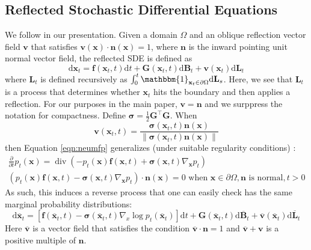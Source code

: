 \documentclass{article}
\theoremstyle{plain}
\theoremstyle{definition}
\theoremstyle{remark}
\DeclareMathOperator{\ddiv}{div}
\newcommand{\sqbrac}[1]{\left[#1\right]}
\newcommand{\norm}[1]{\left\|#1\right\|}
\newcommand{\grad}{\nabla}
\newcommand{\parderiv}[2]{\frac{\partial #1}{\partial #2}}
\renewcommand{\vec}{\mathbf}
\newcommand{\dd}{\mathrm{d}}
\begin{document}
\subsection{Reflected Stochastic Differential Equations}\label{sec:app:theory:rsde}

We follow \citet{Pilipenko2014AnIT} in our presentation. Given a domain $\Omega$ and an oblique reflection vector field $\vec{v}$ that satisfies $\vec{v}(\vec{x}) \cdot \vec{n}(\vec{x}) = 1$, where $\vec{n}$ is the inward pointing unit normal vector field, the reflected SDE is defined as
\begin{equation}
    \dd\vec{x}_t = \vec{f}(\vec{x}_t, t)\dd t + \vec{G}(\vec{x}_t, t) \dd \vec{B}_t + \vec{v}(\vec{x}_t) \dd \vec{L}_t
\end{equation}
where $\vec{L}_t$ is defined recursively as $\int_0^t \mathbbm{1}_{\vec{x}_t \in \partial \Omega} \dd \vec{L}_s$. Here, we see that $\vec{L}_t$ is a process that determines whether $\vec{x}_t$ hits the boundary and then applies a reflection. For our purposes in the main paper, $\vec{v} = \vec{n}$ and we surppress the notation for compactness.
Define $\bm{\sigma} = \frac{1}{2} \vec{G}^\top \vec{G}$. When
\begin{equation}
    \vec{v}(\vec{x}_t, t) = \frac{\bm{\sigma}(\vec{x}_t, t) \vec{n}(\vec{x})}{\norm{\bm{\sigma}(\vec{x}_t, t) \vec{n}(\vec{x})}}
\end{equation}
then Equation \ref{eqn:neumfp} generalizes (under suitable regularity conditions) \citep{Schuss2013BrownianDA}:
\begin{equation}\label{eqn:app:neumfp}
    \begin{gathered}
        \parderiv{}{t}p_t(\vec{x}) = \ddiv(- p_t(\vec{x}) \vec{f}(\vec{x}, t) + \bm{\sigma}(\vec{x}, t) \grad_\vec{x} p_t)\\ (p_t(\vec{x}) \vec{f}(\vec{x}, t) - \bm{\sigma}(\vec{x}, t) \grad_\vec{x} p_t) \cdot \vec{n}(\vec{x}) = 0 \text{ when } \vec{x} \in \partial \Omega,  \vec{n} \text{ is normal}, t > 0
    \end{gathered}
\end{equation}
As such, this induces a reverse process \citep{Williams1988OnTO, Cattiaux1988TimeRO} that one can easily check has the same marginal probability distributions:
\begin{equation}
    \dd\overline{\vec{x}}_t = \sqbrac{\vec{f}(\overline{\vec{x}}_t, t) - \bm{\sigma}(\overline{\vec{x}}_t, t) \grad_x \log p_t(\overline{\vec{x}}_t)} \dd t + \vec{G}(\overline{\vec{x}}_t, t) \dd \overline{\vec{B}}_t + \overline{\vec{v}}(\overline{\vec{x}}_t) \dd \overline{\vec{L}}_t
\end{equation}
Here $\overline{\vec{v}}$ is a vector field that satisfies the condition $\overline{\vec{v}} \cdot \vec{n} = 1$ and $\overline{\vec{v}} + \vec{v}$ is a positive multiple of $\vec{n}$.
\end{document}
